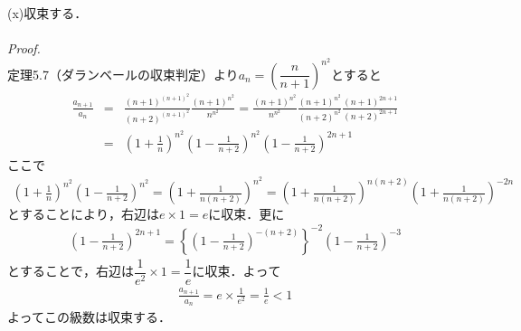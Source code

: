 \documentclass[dvipdfmx,uplatex,11pt]{jsarticle}
\theoremstyle{definition}
\begin{document}
	\begin{screen}
	(x)収束する．\\
	\dotfill \\
	{\it Proof.}\\
	定理5.7（ダランベールの収束判定）より$a_n=\left(\dfrac{n}{n+1}\right)^{n^2}$とすると
	\begin{eqnarray*}
	\frac{a_{n+1}}{a_n}&=&\frac{(n+1)^{(n+1)^2}}{(n+2)^{(n+1)^2}}\frac{(n+1)^{n^2}}{n^{n^2}}=\frac{(n+1)^{n^2}}{n^{n^2}}\frac{(n+1)^{n^2}}{(n+2)^{n^2}}\frac{(n+1)^{2n+1}}{(n+2)^{2n+1}}\\
	&=&\left(1+\frac{1}{n}\right)^{n^2}\left(1-\frac{1}{n+2}\right)^{n^2}\left(1-\frac{1}{n+2}\right)^{2n+1}
	\end{eqnarray*}
	ここで
	\begin{eqnarray*}
	\left(1+\frac{1}{n}\right)^{n^2}\left(1-\frac{1}{n+2}\right)^{n^2}=\left(1+\frac{1}{n(n+2)}\right)^{n^2}=\left(1+\frac{1}{n(n+2)}\right)^{n(n+2)}\left(1+\frac{1}{n(n+2)}\right)^{-2n}
	\end{eqnarray*}
	$とすることにより，右辺はe \times 1=eに収束．更に$
	\begin{eqnarray*}
	\left(1-\frac{1}{n+2}\right)^{2n+1}=\left\{\left(1-\frac{1}{n+2}\right)^{-(n+2)}\right\}^{-2}\left(1-\frac{1}{n+2}\right)^{-3}
	\end{eqnarray*}
	$とすることで，右辺は\dfrac{1}{e^2} \times 1=\dfrac{1}{e}に収束．よって$
	\begin{eqnarray*}
	\frac{a_{n+1}}{a_n}=e \times \frac{1}{e^2}=\frac{1}{e}<1
	\end{eqnarray*}
	よってこの級数は収束する．
\end{screen}

​\newpage
\end{document}
